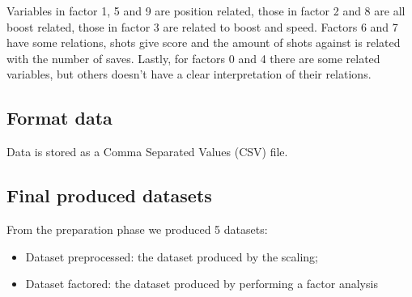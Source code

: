 Variables in factor 1, 5 and 9 are position related, those in factor 2 and 8 are all boost related, those in factor 3 are related to boost and speed. Factors 6 and 7 have some relations, shots give score and the amount of shots against is related with the number of saves. Lastly, for factors 0 and 4 there are some related variables, but others doesn't have a clear interpretation of their relations.

\subsection{Format data}

Data is stored as a Comma Separated Values (CSV) file.

\subsection{Final produced datasets}

From the preparation phase we produced 5 datasets:

\begin{itemize}
    \item Dataset preprocessed: the dataset produced by the scaling;
    \item Dataset factored: the dataset produced by performing a factor analysis
\end{itemize}